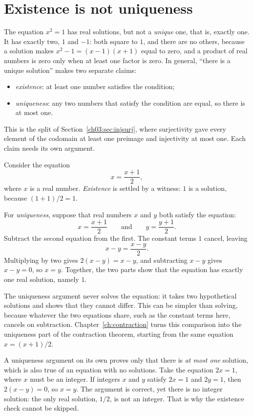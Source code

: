 \section{Existence is not uniqueness}\label{ch04:sec:unique}
The equation $x^2=1$ has real solutions, but not a \emph{unique} one, that is, exactly one. It has exactly two, $1$ and $-1$: both square to $1$, and there are no others, because a solution makes $x^2-1=(x-1)(x+1)$ equal to zero, and a product of real numbers is zero only when at least one factor is zero. In general, ``there is a unique solution'' makes two separate claims:
\begin{itemize}
\item \emph{existence}: at least one number satisfies the condition;
\item \emph{uniqueness}: any two numbers that satisfy the condition are equal, so there is at most one.
\end{itemize}
This is the split of Section~\ref{ch03:sec:injsurj}, where surjectivity gave every element of the codomain at least one preimage and injectivity at most one. Each claim needs its own argument.

Consider the equation
\[
x=\frac{x+1}{2},
\]
where $x$ is a real number. \emph{Existence} is settled by a witness: $1$ is a solution, because $(1+1)/2=1$.

For \emph{uniqueness}, suppose that real numbers $x$ and $y$ both satisfy the equation:
\[
x=\frac{x+1}{2}\qquad\text{and}\qquad y=\frac{y+1}{2}.
\]
Subtract the second equation from the first. The constant terms $1$ cancel, leaving
\[
x-y=\frac{x-y}{2}.
\]
Multiplying by two gives $2(x-y)=x-y$, and subtracting $x-y$ gives $x-y=0$, so $x=y$. Together, the two parts show that the equation has exactly one real solution, namely $1$.

The uniqueness argument never solves the equation: it takes two hypothetical solutions and shows that they cannot differ. This can be simpler than solving, because whatever the two equations share, such as the constant terms here, cancels on subtraction. Chapter~\ref{ch:contraction} turns this comparison into the uniqueness part of the contraction theorem, starting from the same equation $x=(x+1)/2$.

A uniqueness argument on its own proves only that there is \emph{at most one} solution, which is also true of an equation with no solutions. Take the equation $2x=1$, where $x$ must be an integer. If integers $x$ and $y$ satisfy $2x=1$ and $2y=1$, then $2(x-y)=0$, so $x=y$. The argument is correct, yet there is no integer solution: the only real solution, $1/2$, is not an integer. That is why the existence check cannot be skipped.

